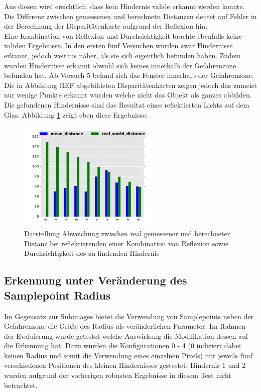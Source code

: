 \noindent
Aus diesen wird ersichtlich, dass kein Hindernis valide erkannt werden konnte. Die Differenz zwischen gemessenen und berechnetn Distanzen deutet auf Fehler in der Berechnung der Disparitätenkarte aufgrund der Reflexion hin.\\

\noindent
Eine Kombination von Reflexion und Durchsichtigkeit brachte ebenfalls keine validen Ergebnisse. In den ersten fünf Versuchen wurden zwar Hindernisse erkannt, jedoch weitaus näher, als sie sich eigentlich befunden haben. Zudem wurden Hindernisse erkannt obwohl  sich keines innerhalb der Gefahrenzone befunden hat. Ab Versuch 5 befand sich das Fenster innerhalb der Gefahrenzone. Die in Abbildung REF abgebildeten Disparitätenkarten zeigen jedoch das zumeist nur wenige Punkte erkannt wurden welche nicht das Objekt als ganzes abbilden. Die gefundenen Hindernisse sind das Resultat eines reflektierten Lichts auf dem Glas. Abbildung \ref{fig:combined} zeigt eben diese Ergebnisse.\\

\begin{figure}
	\centering
	\includegraphics[width=7cm]{img/reflection/combined_bar}
	\caption{Darstellung Abweichung zwischen real gemessener und berechneter Distanz bei reflektierenden einer Kombination von Reflexion sowie Durchsichtigkeit des zu findenden Hindernis}
	\label{fig:combined}
\end{figure}

\subsection{Erkennung unter Veränderung des Samplepoint Radius}
\label{subsec:test_samplepoint_radius}

Im Gegensatz zur Subimages bietet die Verwendung von Samplepoints neben der Gefahrenzone die Größe des Radius als veränderlichen Parameter. Im Rahmen der Evaluierung wurde getestet welche Auswirkung die Modifikation dessen auf die Erkennung hat. Dazu wurden die Konfigurationen 0 - 4 (0 indiziert dabei keinen Radius und somit die Verwendung eines einzelnen Pixels) mit jeweils fünf verschiedenen Positionen des kleinen Hindernisses gestestet. Hindernis 1 und 2 wurden aufgrund der vorherigen robusten Ergebnisse in diesem Test nicht betrachtet.\\

